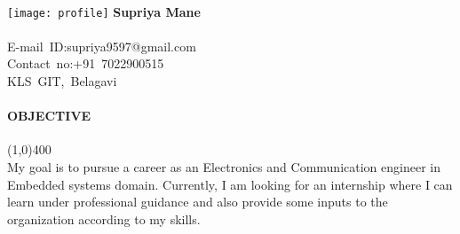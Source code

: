 \documentclass[12pt,a4paper]{article}
\begin{document}
\paragraph{}
\texttt{[image: profile]}
\textbf{\LARGE Supriya Mane\\}\hfill
\\
\mbox{E-mail ID:\large supriya9597@gmail.com}\\
\mbox{Contact no:\large +91 7022900515}\\
\mbox{\large KLS GIT, Belagavi}\\
\paragraph{OBJECTIVE}
\line(1,0){400}\\
My goal is to pursue a career as an Electronics and Communication engineer in Embedded systems domain. Currently, I am looking for an internship where I can learn under professional guidance and also provide some inputs to the organization according to my skills.
\end{document}
